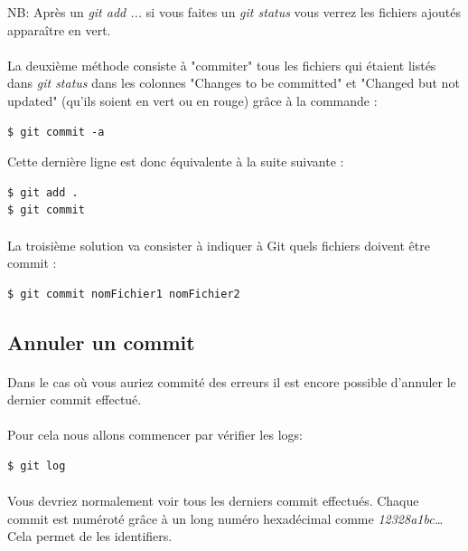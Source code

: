 \documentclass[french, a4paper, 12pt, titlepage]{article}
\begin{document}
NB: Après un \emph{git add ...} si vous faites un \emph{git status} vous verrez les fichiers ajoutés apparaître en vert.

\paragraph{}La deuxième méthode consiste à "commiter" tous les fichiers qui étaient listés dans \emph{git status} dans les colonnes "Changes to be committed" et "Changed but not updated" (qu’ils soient en vert ou en rouge) grâce à la commande :
\begin{lstlisting}
$ git commit -a
\end{lstlisting}
Cette dernière ligne est donc équivalente à la suite suivante :
\begin{lstlisting}
$ git add .
$ git commit
\end{lstlisting}

\paragraph{}La troisième solution va consister à indiquer à Git quels fichiers doivent être commit :
\begin{lstlisting}
$ git commit nomFichier1 nomFichier2
\end{lstlisting}

\subsection{Annuler un commit}
\paragraph{}Dans le cas où vous auriez commité des erreurs il est encore possible d'annuler le dernier commit effectué.
\paragraph{}Pour cela nous allons commencer par vérifier les logs:
\begin{lstlisting}
$ git log
\end{lstlisting}

\paragraph{}Vous devriez normalement voir tous les derniers commit effectués.
Chaque commit est numéroté grâce à un long numéro hexadécimal comme
\textit{12328a1bc\ldots} Cela permet de les identifiers.
\end{document}
